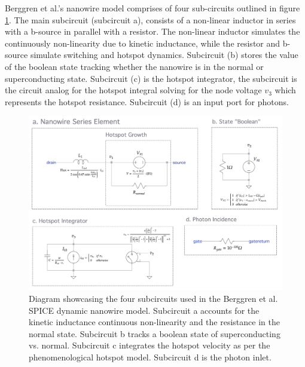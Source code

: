 \documentclass[]{article}
\newcommand{\todofig}[2][]{}
\begin{document}
Berggren et al.'s nanowire model comprises of four sub-circuits outlined in figure \ref{fig:old_nw}. The main subcircuit (subcircuit a), consists of a
non-linear inductor in series with a b-source in parallel with a resistor.
The non-linear inductor simulates the continuously non-linearity due to kinetic inductance,
while the resistor and b-source simulate switching and hotspot dynamics.
Subcircuit (b) stores the value of the boolean state tracking 
whether the nanowire is in the normal or superconducting state.
Subcircuit (c) is the hotspot integrator, the subcircuit is the
circuit analog for the hotspot integral solving for the node voltage $v_3$
which represents the hotspot resistance. Subcircuit (d) is an input port for
photons.

\begin{figure}
    \centering
    \includegraphics[width=\textwidth]{figs/old_nw.png}
    \caption{Diagram showcasing the four subcircuits used in the 
    Berggren et al. SPICE dynamic nanowire model. 
    Subcircuit a accounts for the kinetic inductance
    continuous non-linearity and the resistance in the normal state. Subcircuit b
    tracks a boolean state of superconducting vs. normal. Subcircuit c integrates
    the hotspot velocity as per the phenomenological hotspot model. Subcircuit
    d is the photon inlet.
    \todofig[inline]{remove the Rgate text from this fig}}
    \label{fig:old_nw}
\end{figure}
\end{document}
